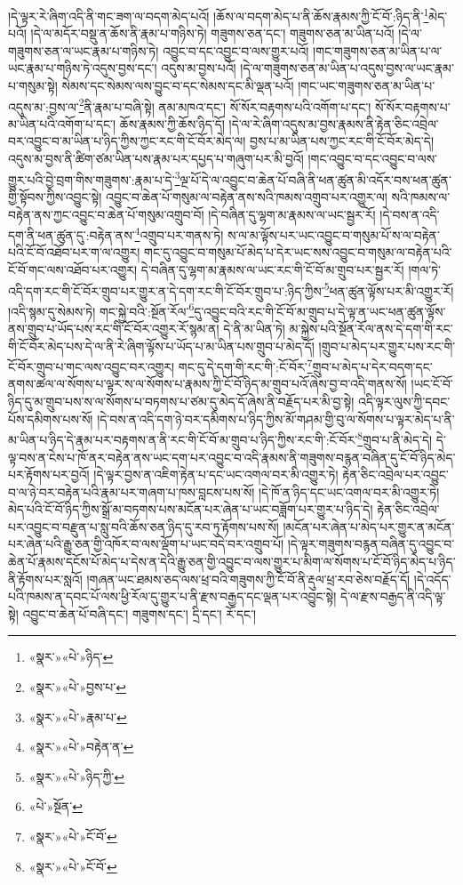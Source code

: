 །དེ་ལྟར་རེ་ཞིག་འདི་ནི་གང་ཟག་ལ་བདག་མེད་པའོ། །ཆོས་ལ་བདག་མེད་པ་ནི་ཆོས་རྣམས་ཀྱི་ངོ་བོ་:ཉིད་ནི་\footnote{«སྣར་»«པེ་»ཉིད་}མེད་པའོ། །དེ་ལ་མདོར་བསྡུ་ན་ཆོས་ནི་རྣམ་པ་གཉིས་ཏེ། གཟུགས་ཅན་དང་། གཟུགས་ཅན་མ་ཡིན་པའོ། །དེ་ལ་གཟུགས་ཅན་ལ་ཡང་རྣམ་པ་གཉིས་ཏེ། འབྱུང་བ་དང་འབྱུང་བ་ལས་གྱུར་པའོ། །གང་གཟུགས་ཅན་མ་ཡིན་པ་ལ་ཡང་རྣམ་པ་གཉིས་ཏེ་འདུས་བྱས་དང་། འདུས་མ་བྱས་པའོ། །དེ་ལ་གཟུགས་ཅན་མ་ཡིན་པ་འདུས་བྱས་ལ་ཡང་རྣམ་པ་གསུམ་སྟེ། སེམས་དང་སེམས་ལས་བྱུང་བ་དང་སེམས་དང་མི་ལྡན་པའོ། །གང་ཡང་གཟུགས་ཅན་མ་ཡིན་པ་འདུས་མ་:བྱས་ལ་\footnote{«སྣར་»«པེ་»བྱས་པ་}ནི་རྣམ་པ་བཞི་སྟེ། ནམ་མཁའ་དང་། སོ་སོར་བརྟགས་པའི་འགོག་པ་དང་། སོ་སོར་བརྟགས་པ་མ་ཡིན་པའི་འགོག་པ་དང་། ཆོས་རྣམས་ཀྱི་ཆོས་ཉིད་དོ། །དེ་ལ་རེ་ཞིག་འདུས་མ་བྱས་རྣམས་ནི་རྟེན་ཅིང་འབྲེལ་བར་འབྱུང་བ་མ་ཡིན་པ་ཉིད་ཀྱིས་ཀྱང་རང་གི་ངོ་བོར་མེད་ལ། བྱས་པ་མ་ཡིན་པས་ཀྱང་རང་གི་ངོ་བོར་མེད་དེ། འདུས་མ་བྱས་ནི་ཚིག་ཙམ་ཡིན་པས་རྣམ་པར་དཔྱད་པ་གཞུག་པར་མི་བྱའོ། །གང་འབྱུང་བ་དང་འབྱུང་བ་ལས་གྱུར་པའི་བྱེ་བྲག་གིས་གཟུགས་:རྣམ་པ་དེ་\footnote{«སྣར་»«པེ་»རྣམ་པ་}ལྔ་པོ་དེ་ལ་འབྱུང་བ་ཆེན་པོ་བཞི་ནི་ཕན་ཚུན་མི་འདོར་བས་ཕན་ཚུན་གྱི་སྟོབས་ཀྱིས་འབྱུང་སྟེ། འབྱུང་བ་ཆེན་པོ་གསུམ་ལ་བརྟེན་ནས་སའི་ཁམས་འགྲུབ་པར་འགྱུར་ལ། སའི་ཁམས་ལ་བརྟེན་ནས་ཀྱང་འབྱུང་བ་ཆེན་པོ་གསུམ་འགྲུབ་བོ། །དེ་བཞིན་དུ་ལྷག་མ་རྣམས་ལ་ཡང་སྦྱར་རོ། །དེ་བས་ན་འདི་དག་ནི་ཕན་ཚུན་དུ་:བརྟེན་ནས་\footnote{«སྣར་»«པེ་»བརྟེན་ན་}འགྲུབ་པར་གནས་ཏེ། ས་ལ་མ་ལྟོས་པར་ཡང་འབྱུང་བ་གསུམ་པོ་ས་ལ་བརྟེན་པའི་ངོ་བོ་འཐོབ་པར་ག་ལ་འགྱུར། གང་དུ་འབྱུང་བ་གསུམ་པོ་མེད་པ་དེར་ཡང་སས་འབྱུང་བ་གསུམ་ལ་བརྟེན་པའི་ངོ་བོ་གང་ལས་འཐོབ་པར་འགྱུར། དེ་བཞིན་དུ་ལྷག་མ་རྣམས་ལ་ཡང་རང་གི་ངོ་བོ་མ་གྲུབ་པར་སྦྱར་རོ། །གལ་ཏེ་འདི་དག་རང་གི་ངོ་བོར་གྲུབ་པར་གྱུར་ན་དེ་དག་རང་གི་ངོ་བོར་གྲུབ་པ་:ཉིད་ཀྱིས་\footnote{«སྣར་»«པེ་»ཉིད་ཀྱི་}ཕན་ཚུན་ལྟོས་པར་མི་འགྱུར་རོ། །འདི་སྙམ་དུ་སེམས་ཏེ། གང་སྐྱེ་བའི་:སྔོན་རོལ་\footnote{«པེ་»སྔོན་}དུ་འབྱུང་བའི་རང་གི་ངོ་བོ་མ་གྲུབ་པ་དེ་ལྟ་ན་ཡང་ཕན་ཚུན་ལྟོས་ནས་གྲུབ་པ་ཡོད་པས་རང་གི་ངོ་བོར་འགྱུར་རོ་སྙམ་ན། དེ་ནི་མ་ཡིན་ཏེ། མ་སྐྱེས་པའི་སྔོན་རོལ་ནས་དེ་དག་གི་རང་གི་ངོ་བོར་མེད་པས་དེ་ལ་ནི་རེ་ཞིག་ལྟོས་པ་ཡོད་པ་མ་ཡིན་པས་གྲུབ་པ་མེད་དོ། །གྲུབ་པ་མེད་པར་གྱུར་པས་རང་གི་ངོ་བོར་གྲུབ་པ་གང་ལས་འབྱུང་བར་འགྱུར། གང་དུ་དེ་དག་གི་རང་གི་:ངོ་བོར་\footnote{«སྣར་»«པེ་»ངོ་བོ་}གྲུབ་པ་མེད་པ་དེར་བདག་དང་ནགས་ཚལ་ལ་སོགས་པ་ལྟར་ས་ལ་སོགས་པ་རྣམས་ཀྱི་ངོ་བོ་ཉིད་མ་གྲུབ་པའོ་ཞེས་བྱ་བ་འདི་གནས་སོ། །ཡང་ངོ་བོ་ཉིད་དུ་མ་གྲུབ་པས་ས་ལ་སོགས་པ་བཏགས་པ་ཙམ་དུ་མེད་དོ་ཞེས་ནི་བརྗོད་པར་མི་བྱ་སྟེ། འདི་ལྟར་ལུས་ཀྱི་དབང་པོས་དམིགས་པས་སོ། །དེ་བས་ན་འདི་དག་ཉེ་བར་དམིགས་པ་ཉིད་ཀྱིས་མོ་གཤམ་གྱི་བུ་ལ་སོགས་པ་ལྟར་མེད་པ་ནི་མ་ཡིན་པ་ཉིད་དེ་རྣམ་པར་བརྟགས་ན་ནི་རང་གི་ངོ་བོ་མ་གྲུབ་པ་ཉིད་ཀྱིས་རང་གི་:ངོ་བོར་\footnote{«སྣར་»«པེ་»ངོ་བོ་}གྲུབ་པ་ནི་མེད་དེ། དེ་ལྟ་བས་ན་ངེས་པ་ཁོ་ནར་བརྟེན་ནས་ཡང་དག་པར་འབྱུང་བ་འདི་རྣམས་ནི་གཟུགས་བརྙན་བཞིན་དུ་ངོ་བོ་ཉིད་མེད་པར་རྟོགས་པར་བྱའོ། །དེ་ལྟར་བྱས་ན་འཇིག་རྟེན་པ་དང་ཡང་འགལ་བར་མི་འགྱུར་ཏེ། རྟེན་ཅིང་འབྲེལ་པར་འབྱུང་བ་ལ་ཉེ་བར་བརྟེན་པའི་རྣམ་པར་གཞག་པ་ཁས་བླངས་པས་སོ། །དེ་ཁོ་ན་ཉིད་དང་ཡང་འགལ་བར་མི་འགྱུར་ཏེ། མེད་པའི་ངོ་བོ་ཉིད་ཀྱིས་སྒྲོ་མ་བཏགས་པས་མངོན་པར་ཞེན་པ་ཡང་བཟློག་པར་གྱུར་པ་ཉིད་དེ། རྟེན་ཅིང་འབྲེལ་པར་འབྱུང་བ་བརྫུན་པ་སླུ་བའི་ཆོས་ཅན་ཉིད་དུ་རབ་ཏུ་རྟོགས་པས་སོ། །མངོན་པར་ཞེན་པ་མེད་པར་གྱུར་ན་མངོན་པར་ཞེན་པའི་རྒྱུ་ཅན་གྱི་འཁོར་བ་ལས་ལྡོག་པ་ཡང་བདེ་བར་འགྲུབ་པོ། །དེ་ལྟར་གཟུགས་བརྙན་བཞིན་དུ་འབྱུང་བ་ཆེན་པོ་རྣམས་དངོས་པོ་མེད་པ་དེས་ན་དེའི་རྒྱུ་ཅན་གྱི་འབྱུང་བ་ལས་གྱུར་པ་མིག་ལ་སོགས་པ་ངོ་བོ་ཉིད་མེད་པ་ཉིད་ནི་རྟོགས་པར་སླའོ། །གཞན་ཡང་ཐམས་ཅད་ལས་ཕྲ་བའི་གཟུགས་ཀྱི་ངོ་བོ་ནི་རྡུལ་ཕྲ་རབ་ཅེས་བརྗོད་དོ། །དེ་འདོད་པའི་ཁམས་ན་དབང་པོ་ལས་ཕྱི་རོལ་དུ་གྱུར་པ་ནི་རྫས་བརྒྱད་དང་ལྡན་པར་འབྱུང་སྟེ། དེ་ལ་རྫས་བརྒྱད་ནི་འདི་ལྟ་སྟེ། འབྱུང་བ་ཆེན་པོ་བཞི་དང་། གཟུགས་དང་། དྲི་དང་། རོ་དང་། 